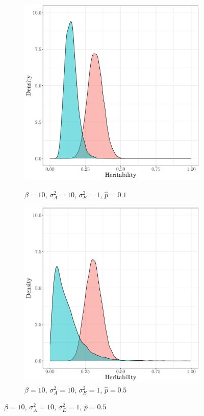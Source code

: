 \begin{figure}
    \centering
    \begin{subfigure}{0.49\textwidth}
    \caption{$\beta=10$, $\sigma^2_A=10$, $\sigma^2_E=1$, $\hat p=0.1$}
    \includegraphics[width=\textwidth]{figures/fixedeffects_gaussian_probit_sA10_p_1.pdf}
    \label{fig:fixedeffects probit vs gaussian:lVAlP}
    \end{subfigure}
    \begin{subfigure}{0.49\textwidth}
    \caption{$\beta=10$, $\sigma^2_A=10$, $\sigma^2_E=1$, $\hat p=0.5$}
    \includegraphics[width=\textwidth]{figures/fixedeffects_gaussian_probit_sA10_p_5.pdf}

\end{subfigure}
\end{figure}
